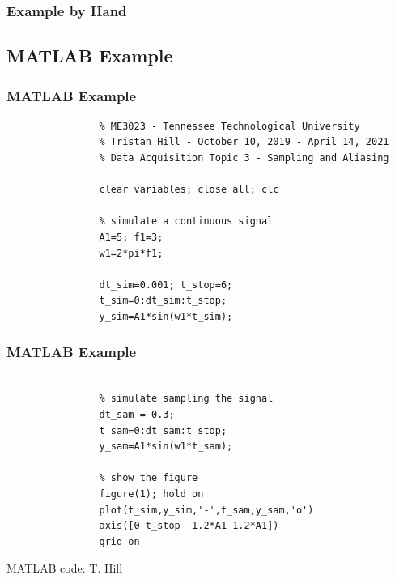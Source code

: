 \documentclass[fleqn]{beamer} %
\newcommand{\sectionIIIsubsectionIIItitle}{Example by Hand}
\newcommand{\sectionIIIsubsectionIVtitle}{MATLAB Example}
\begin{document}
			\begin{frame}
				\frametitle{\sectionIIIsubsectionIIItitle}



			\end{frame}

		\subsection{\sectionIIIsubsectionIVtitle}\label{sectionIIIsubsectionIV}	

			\begin{frame}[containsverbatim]
				\frametitle{\sectionIIIsubsectionIVtitle}\scriptsize

				\begin{lstlisting}
				% ME3023 - Tennessee Technological University 
				% Tristan Hill - October 10, 2019 - April 14, 2021
				% Data Acquisition Topic 3 - Sampling and Aliasing

				clear variables; close all; clc

				% simulate a continuous signal
				A1=5; f1=3;
				w1=2*pi*f1;

				dt_sim=0.001; t_stop=6;
				t_sim=0:dt_sim:t_stop;
				y_sim=A1*sin(w1*t_sim);
				\end{lstlisting}

			\end{frame}

			\begin{frame}[containsverbatim]
				\frametitle{\sectionIIIsubsectionIVtitle}\scriptsize
				
				\begin{lstlisting}

				% simulate sampling the signal
				dt_sam = 0.3;
				t_sam=0:dt_sam:t_stop;
				y_sam=A1*sin(w1*t_sam);

				% show the figure
				figure(1); hold on
				plot(t_sim,y_sim,'-',t_sam,y_sam,'o')
				axis([0 t_stop -1.2*A1 1.2*A1])
				grid on
				\end{lstlisting}


			
				\tiny{MATLAB code: T. Hill}	

			\end{frame}
\end{document}
